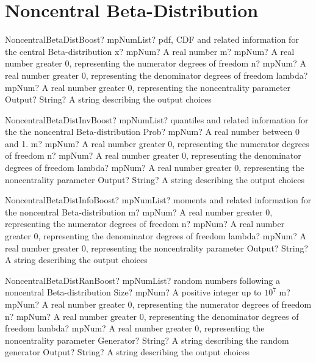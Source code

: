 \documentclass[12pt,a4paper,openany]{book}
\begin{document}
\section{Noncentral Beta-Distribution}

\begin{mpFunctionsExtract}
\mpFunctionFiveNotImplemented
{NoncentralBetaDistBoost? mpNumList? pdf, CDF and related information for the central Beta-distribution}
{x? mpNum? A real number}
{m? mpNum? A real number greater 0, representing the numerator  degrees of freedom}
{n? mpNum? A real number greater 0, representing the denominator degrees of freedom}
{lambda? mpNum? A real number greater 0, representing the noncentrality parameter}
{Output? String? A string describing the output choices}
\end{mpFunctionsExtract}

\begin{mpFunctionsExtract}
\mpFunctionFiveNotImplemented
{NoncentralBetaDistInvBoost? mpNumList? quantiles and related information for the the noncentral Beta-distribution}
{Prob? mpNum? A real number between 0 and 1.}
{m? mpNum? A real number greater 0, representing the numerator  degrees of freedom}
{n? mpNum? A real number greater 0, representing the denominator degrees of freedom}
{lambda? mpNum? A real number greater 0, representing the noncentrality parameter}
{Output? String? A string describing the output choices}
\end{mpFunctionsExtract}

\begin{mpFunctionsExtract}
\mpFunctionFourNotImplemented
{NoncentralBetaDistInfoBoost? mpNumList? moments and related information for the noncentral Beta-distribution}
{m? mpNum? A real number greater 0, representing the numerator  degrees of freedom}
{n? mpNum? A real number greater 0, representing the denominator degrees of freedom}
{lambda? mpNum? A real number greater 0, representing the noncentrality parameter}
{Output? String? A string describing the output choices}
\end{mpFunctionsExtract}

\begin{mpFunctionsExtract}
\mpFunctionSixNotImplemented
{NoncentralBetaDistRanBoost? mpNumList? random numbers following a noncentral Beta-distribution}
{Size? mpNum? A positive integer up to $10^7$}
{m? mpNum? A real number greater 0, representing the numerator  degrees of freedom}
{n? mpNum? A real number greater 0, representing the denominator degrees of freedom}
{lambda? mpNum? A real number greater 0, representing the noncentrality parameter}
{Generator? String? A string describing the random generator}
{Output? String? A string describing the output choices}
\end{mpFunctionsExtract}
\end{document}

